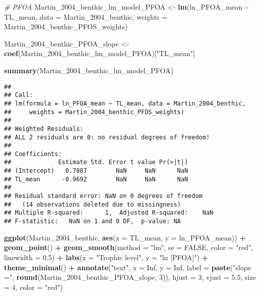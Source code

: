 \documentclass[
]{article}
\newenvironment{Shaded}{\begin{snugshade}}{\end{snugshade}}
\newcommand{\AttributeTok}[1]{\textcolor[rgb]{0.13,0.29,0.53}{#1}}
\newcommand{\CommentTok}[1]{\textcolor[rgb]{0.56,0.35,0.01}{\textit{#1}}}
\newcommand{\ConstantTok}[1]{\textcolor[rgb]{0.56,0.35,0.01}{#1}}
\newcommand{\DecValTok}[1]{\textcolor[rgb]{0.00,0.00,0.81}{#1}}
\newcommand{\FloatTok}[1]{\textcolor[rgb]{0.00,0.00,0.81}{#1}}
\newcommand{\FunctionTok}[1]{\textcolor[rgb]{0.13,0.29,0.53}{\textbf{#1}}}
\newcommand{\NormalTok}[1]{#1}
\newcommand{\OtherTok}[1]{\textcolor[rgb]{0.56,0.35,0.01}{#1}}
\newcommand{\SpecialCharTok}[1]{\textcolor[rgb]{0.81,0.36,0.00}{\textbf{#1}}}
\newcommand{\StringTok}[1]{\textcolor[rgb]{0.31,0.60,0.02}{#1}}
\begin{document}
\begin{Shaded}
\begin{Highlighting}[]
\CommentTok{\# PFOA}
\NormalTok{Martin\_2004\_benthic\_lm\_model\_PFOA }\OtherTok{\textless{}{-}} \FunctionTok{lm}\NormalTok{(ln\_PFOA\_mean }\SpecialCharTok{\textasciitilde{}}\NormalTok{ TL\_mean, }
                                        \AttributeTok{data =}\NormalTok{ Martin\_2004\_benthic,}
                                        \AttributeTok{weights =}\NormalTok{ Martin\_2004\_benthic\_PFOS\_weights)}

\NormalTok{Martin\_2004\_benthic\_PFOA\_slope }\OtherTok{\textless{}{-}} \FunctionTok{coef}\NormalTok{(Martin\_2004\_benthic\_lm\_model\_PFOA)[}\StringTok{"TL\_mean"}\NormalTok{]}

\FunctionTok{summary}\NormalTok{(Martin\_2004\_benthic\_lm\_model\_PFOA)}
\end{Highlighting}
\end{Shaded}

\begin{verbatim}
## 
## Call:
## lm(formula = ln_PFOA_mean ~ TL_mean, data = Martin_2004_benthic, 
##     weights = Martin_2004_benthic_PFOS_weights)
## 
## Weighted Residuals:
## ALL 2 residuals are 0: no residual degrees of freedom!
## 
## Coefficients:
##             Estimate Std. Error t value Pr(>|t|)
## (Intercept)   0.7887        NaN     NaN      NaN
## TL_mean      -0.9692        NaN     NaN      NaN
## 
## Residual standard error: NaN on 0 degrees of freedom
##   (14 observations deleted due to missingness)
## Multiple R-squared:      1,  Adjusted R-squared:    NaN 
## F-statistic:   NaN on 1 and 0 DF,  p-value: NA
\end{verbatim}

\begin{Shaded}
\begin{Highlighting}[]
\FunctionTok{ggplot}\NormalTok{(Martin\_2004\_benthic, }\FunctionTok{aes}\NormalTok{(}\AttributeTok{x =}\NormalTok{ TL\_mean, }\AttributeTok{y =}\NormalTok{ ln\_PFOA\_mean)) }\SpecialCharTok{+}
  \FunctionTok{geom\_point}\NormalTok{() }\SpecialCharTok{+}
  \FunctionTok{geom\_smooth}\NormalTok{(}\AttributeTok{method =} \StringTok{"lm"}\NormalTok{, }\AttributeTok{se =} \ConstantTok{FALSE}\NormalTok{, }\AttributeTok{color =} \StringTok{"red"}\NormalTok{, }\AttributeTok{linewidth =} \FloatTok{0.5}\NormalTok{) }\SpecialCharTok{+}
  \FunctionTok{labs}\NormalTok{(}\AttributeTok{x =} \StringTok{"Trophic level"}\NormalTok{,}
       \AttributeTok{y =} \StringTok{"ln [PFOA]"}\NormalTok{) }\SpecialCharTok{+}
  \FunctionTok{theme\_minimal}\NormalTok{() }\SpecialCharTok{+}
  \FunctionTok{annotate}\NormalTok{(}\StringTok{"text"}\NormalTok{, }\AttributeTok{x =} \ConstantTok{Inf}\NormalTok{, }\AttributeTok{y =} \ConstantTok{Inf}\NormalTok{, }\AttributeTok{label =} \FunctionTok{paste}\NormalTok{(}\StringTok{"slope ="}\NormalTok{, }\FunctionTok{round}\NormalTok{(Martin\_2004\_benthic\_PFOA\_slope, }\DecValTok{3}\NormalTok{)), }
           \AttributeTok{hjust =} \DecValTok{3}\NormalTok{, }\AttributeTok{vjust =} \FloatTok{5.5}\NormalTok{, }\AttributeTok{size =} \DecValTok{4}\NormalTok{, }\AttributeTok{color =} \StringTok{"red"}\NormalTok{)}
\end{Highlighting}
\end{Shaded}
\end{document}
